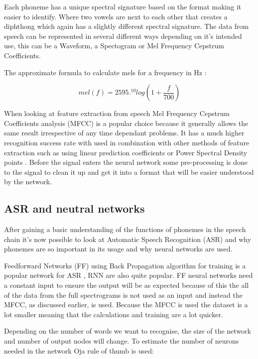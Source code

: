 \documentclass[11pt]{article}
\begin{document}
    Each phoneme has a unique spectral signature based on the format making it easier to identify. Where two vowels are next to each other that creates a diphthong which again has a slightly different spectral signature. The data from speech can be represented in several different ways depending on it's intended use, this can be a Waveform, a Spectogram or Mel Frequency Cepstrum Coefficients. 
    
    The approximate formula to calculate mels for a frequency in Hz \cite{Gevaert2010NeuralRecognition}:
    
    \begin{equation}
    mel(f)=2595.^{10} log(1+ \frac{f}{700})
    \end{equation}

   When looking at feature extraction from speech Mel Frequency Cepstrum Coefficients analysis (MFCC) is a popular choice because it generally allows the same result irrespective of any time dependant problems. It has a much higher recognition success rate with used in combination with other methods of feature extraction such as using linear prediction coefficients or Power Spectral Density points \cite{Moonasar2001ASystems}. Before the signal enters the neural network some pre-processing \cite{Liu1993EfficientRecognition} is done to the signal to clean it up and get it into a format that will be easier understood by the network.

    \subsection{ASR and neutral networks}
    After gaining a basic understanding of the functions of phonemes in the speech chain it's now possible to look at Automatic Speech Recognition (ASR) and why phonemes are so important in its usage and why neural networks are used.
    
    Feedforward Networks (FF) using Back Propagation algorithm for training is a popular network for ASR \cite{K.R2016AutomaticSurvey}, RNN are also quite popular. FF neural networks need a constant input to ensure the output will be as expected because of this the all of the data from the full spectrograms is not used as an input and instead the MFCC, as discussed earlier, is used. Because the MFCC is used the dataset is a lot smaller meaning that the calculations and training are a lot quicker. 
    
    Depending on the number of words we want to recognise, the size of the network and number of output nodes will change. To estimate the number of neurons needed in the network Oja rule of thumb \cite{Oja1982SimplifiedAnalyzer} is used:
    
\end{document}
